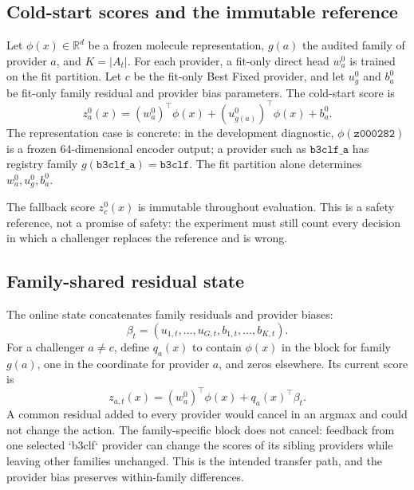 \documentclass[sigconf,anonymous]{aamas}
\begin{document}
\subsection{Cold-start scores and the immutable reference}
Let $\phi(x)\in\mathbb{R}^{d}$ be a frozen molecule representation, $g(a)$ the audited family of provider $a$, and $K=|A_t|$. For each provider, a fit-only direct head $w_a^0$ is trained on the fit partition. Let $c$ be the fit-only Best Fixed provider, and let $u_g^0$ and $b_a^0$ be fit-only family residual and provider bias parameters. The cold-start score is
$$
z_a^0(x)=(w_a^0)^\top\phi(x)+(u_{g(a)}^0)^\top\phi(x)+b_a^0.
$$
The representation case is concrete: in the development diagnostic, $\phi(\texttt{z000282})$ is a frozen 64-dimensional encoder output; a provider such as $\texttt{b3clf\_a}$ has registry family $g(\texttt{b3clf\_a})=\texttt{b3clf}$. The fit partition alone determines $w_a^0,u_g^0,b_a^0$.

The fallback score $z_c^0(x)$ is immutable throughout evaluation. This is a safety reference, not a promise of safety: the experiment must still count every decision in which a challenger replaces the reference and is wrong.

\subsection{Family-shared residual state}
The online state concatenates family residuals and provider biases:
$$
\beta_t=(u_{1,t},\ldots,u_{G,t},b_{1,t},\ldots,b_{K,t}).
$$
For a challenger $a\neq c$, define $q_a(x)$ to contain $\phi(x)$ in the block for family $g(a)$, one in the coordinate for provider $a$, and zeros elsewhere. Its current score is
$$
z_{a,t}(x)=(w_a^0)^\top\phi(x)+q_a(x)^\top\beta_t.
$$
A common residual added to every provider would cancel in an argmax and could not change the action. The family-specific block does not cancel: feedback from one selected `b3clf` provider can change the scores of its sibling providers while leaving other families unchanged. This is the intended transfer path, and the provider bias preserves within-family differences.
\end{document}
